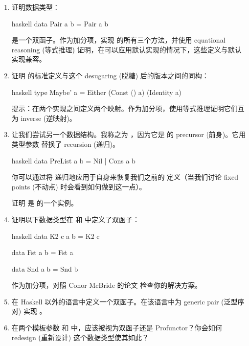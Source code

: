 \begin{enumerate}
  \tightlist
  \item
        证明数据类型：

        \begin{snip}{haskell}
data Pair a b = Pair a b
\end{snip}

        是一个双函子。作为加分项，实现  的所有三个方法，并使用 equational reasoning (等式推理) 证明，在可以应用默认实现的情况下，这些定义与默认实现兼容。
  \item
        证明  的标准定义与这个 desugaring (脱糖) 后的版本之间的同构：

        \begin{snip}{haskell}
type Maybe' a = Either (Const () a) (Identity a)
\end{snip}

        提示：在两个实现之间定义两个映射。作为加分项，使用等式推理证明它们互为 inverse (逆映射)。
  \item
        让我们尝试另一个数据结构。我称之为 ，因为它是  的 precursor (前身)。它用类型参数  替换了 recursion (递归)。

        \begin{snip}{haskell}
data PreList a b = Nil | Cons a b
\end{snip}

        你可以通过将  递归地应用于自身来恢复我们之前的  定义（当我们讨论 fixed points (不动点) 时会看到如何做到这一点）。

        证明  是  的一个实例。
  \item
        证明以下数据类型在  和  中定义了双函子：

        \begin{snip}{haskell}
data K2 c a b = K2 c

data Fst a b = Fst a

data Snd a b = Snd b
\end{snip}

        作为加分项，对照 Conor McBride 的论文  检查你的解决方案。
  \item
        在 Haskell 以外的语言中定义一个双函子。在该语言中为 generic pair (泛型序对) 实现 。
  \item
         在两个模板参数  和  中，应该被视为双函子还是 Profunctor？你会如何 redesign (重新设计) 这个数据类型使其如此？
\end{enumerate}